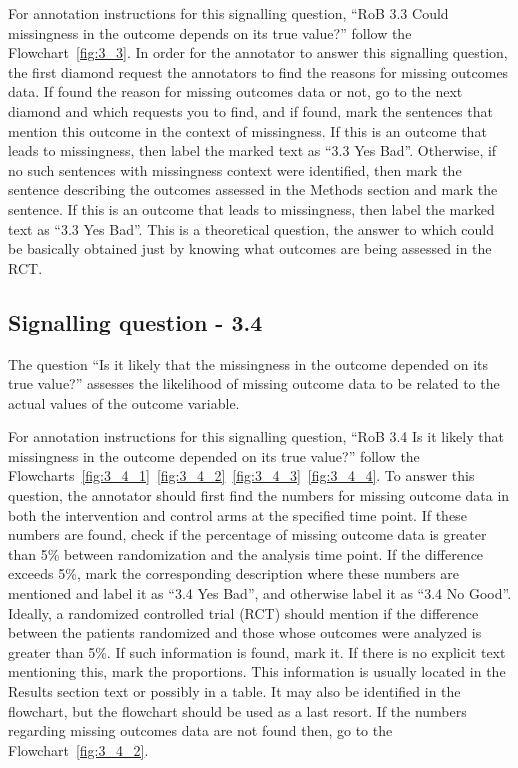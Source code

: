 \documentclass[sn-mathphys,Numbered]{sn-jnl}%
\begin{document}
For annotation instructions for this signalling question, ``RoB 3.3 Could missingness in the outcome depends on its true value?'' follow the Flowchart~\ref{fig:3_3}.
In order for the annotator to answer this signalling question, the first diamond request the annotators to find the reasons for missing outcomes data.
If found the reason for missing outcomes data or not, go to the next diamond and which requests you to find, and if found, mark the sentences that mention this outcome in the context of missingness.
If this is an outcome that leads to missingness, then label the marked text as ``3.3 Yes Bad''.
Otherwise, if no such sentences with missingness context were identified, then mark the sentence describing the outcomes assessed in the Methods section and mark the sentence.
If this is an outcome that leads to missingness, then label the marked text as ``3.3 Yes Bad''.
This is a theoretical question, the answer to which could be basically obtained just by knowing what outcomes are being assessed in the RCT.
%
%
%
\subsection*{Signalling question - 3.4 }
\label{subsec:3_4}
%
The question ``Is it likely that the missingness in the outcome depended on its true value?'' assesses the likelihood of missing outcome data to be related to the actual values of the outcome variable.


For annotation instructions for this signalling question, ``RoB 3.4 Is it likely that missingness in the outcome depended on its true value?'' follow the Flowcharts~\ref{fig:3_4_1}~\ref{fig:3_4_2}~\ref{fig:3_4_3}~\ref{fig:3_4_4}.
To answer this question, the annotator should first find the numbers for missing outcome data in both the intervention and control arms at the specified time point.
If these numbers are found, check if the percentage of missing outcome data is greater than 5\% between randomization and the analysis time point.
If the difference exceeds 5\%, mark the corresponding description where these numbers are mentioned and label it as ``3.4 Yes Bad'', and otherwise label it as ``3.4 No Good''.
Ideally, a randomized controlled trial (RCT) should mention if the difference between the patients randomized and those whose outcomes were analyzed is greater than 5\%.
If such information is found, mark it.
If there is no explicit text mentioning this, mark the proportions.
This information is usually located in the Results section text or possibly in a table. It may also be identified in the flowchart, but the flowchart should be used as a last resort.
If the numbers regarding missing outcomes data are not found then, go to the Flowchart~\ref{fig:3_4_2}.
\end{document}
